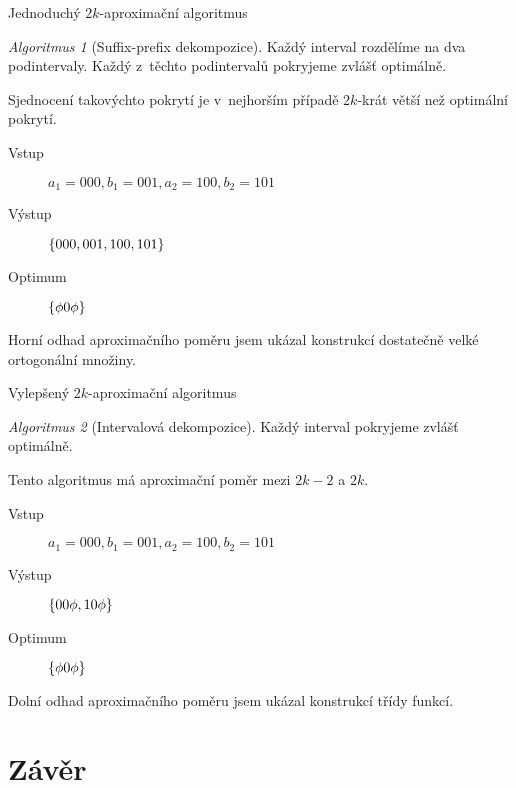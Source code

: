 \documentclass{beamer}
\theoremstyle{remark}
\newtheorem{algorithm}{Algoritmus}
\begin{document}
\begin{frame}{Jednoduchý $2k$-aproximační algoritmus}
\begin{algorithm}[Suffix-prefix dekompozice]
Každý interval rozdělíme na dva  podintervaly.
Každý z~těchto podintervalů pokryjeme zvlášť optimálně.
\end{algorithm}

Sjednocení takovýchto pokrytí je v~nejhorším případě $2k$-krát větší než optimální pokrytí.

\begin{example}
\begin{description}
\item[Vstup]
$a_1 = 000, b_1 = 001, a_2 = 100, b_2 = 101$

\item[Výstup]
$\{000, 001, 100, 101\}$

\item[Optimum]
$\{\phi 0 \phi\}$
\end{description}
\end{example}

Horní odhad aproximačního poměru jsem ukázal konstrukcí dostatečně velké ortogonální množiny.
\end{frame}

\begin{frame}{Vylepšený $2k$-aproximační algoritmus}
\begin{algorithm}[Intervalová dekompozice]
Každý interval pokryjeme zvlášť optimálně.
\end{algorithm}

Tento algoritmus má aproximační poměr mezi $2k-2$ a $2k$.

\begin{example}
\begin{description}
\item[Vstup]
$a_1 = 000, b_1 = 001, a_2 = 100, b_2 = 101$

\item[Výstup]
$\{00 \phi, 10 \phi\}$

\item[Optimum]
$\{\phi 0 \phi\}$
\end{description}
\end{example}

Dolní odhad aproximačního poměru jsem ukázal konstrukcí třídy  funkcí.
\end{frame}

\section{Závěr}
\end{document}
